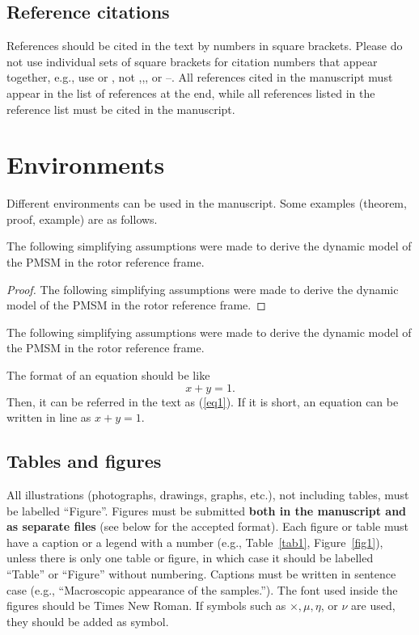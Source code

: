 \documentclass{elektr}
\begin{document}
\subsection{Reference citations}
References should be cited in the text by numbers in square brackets. Please do not use individual sets of square brackets for citation numbers that appear together, e.g., use \cite{ref1,ref4} or \cite{ref1,ref2,ref3,ref5}, not \cite{ref1},\cite{ref2},\cite{ref3}, or \cite{ref4}--\cite{ref6}. All references cited in the manuscript must appear in the list of references at the end, while all references listed in the reference list must be cited in the manuscript.

\section{Environments}
Different environments can be used in the manuscript. Some examples (theorem, proof, example) are as follows.

\begin{theorem} \label{the1}
The following simplifying assumptions were made to derive the dynamic model of the PMSM in the rotor reference frame.
\end{theorem}

\begin{proof}
The following simplifying assumptions were made to derive the dynamic model of the PMSM in the rotor reference frame.
\end{proof}

\begin{example}\label{exm1}
The following simplifying assumptions were made to derive the dynamic model of the PMSM in the rotor reference frame.
\end{example}

The format of an equation should be like
\begin{equation}
\label{eq1}
x+y = 1.
\end{equation}
Then, it can be referred in the text as (\ref{eq1}). If it is short, an equation can be written in line as $x+y=1$.

\subsection{Tables and figures}
All illustrations (photographs, drawings, graphs, etc.), not including tables, must be labelled ``Figure''. Figures must be submitted \textbf{both in the manuscript and as separate files} (see below for the accepted format). Each figure or table must have a caption or a legend with a number (e.g., Table~\ref{tab1}, Figure~\ref{fig1}), unless there is only one table or figure, in which case it should be labelled ``Table'' or ``Figure'' without numbering. Captions must be written in sentence case (e.g., ``Macroscopic appearance of the samples.''). The font used inside the figures should be Times New Roman. If symbols such as $\times, \mu, \eta$, or $\nu$ are used, they should be added as symbol.
\end{document}
